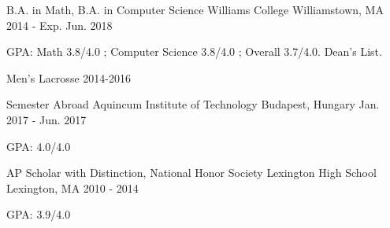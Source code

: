 

\begin{cventries}

\begin{cventry}
  {B.A. in Math, B.A. in Computer Science} %
  {Williams College} %
  {Williamstown, MA} %
  {2014 - Exp. Jun. 2018} %
  {
    \begin{cvitems} %
      \item {GPA: Math 3.8/4.0 ; Computer Science 3.8/4.0 ; Overall 3.7/4.0. Dean's List.}
      \item {Men's Lacrosse 2014-2016}
    \end{cvitems}
  }
\end{cventry}
\cventry
  {Semester Abroad} %
  {Aquincum Institute of Technology} %
  {Budapest, Hungary} %
  {Jan. 2017 - Jun. 2017} %
  {
    \begin{cvitems} %
      \item {GPA: 4.0/4.0}\\
    \end{cvitems}
  }

\cventry
  {AP Scholar with Distinction, National Honor Society} %
  {Lexington High School} %
  {Lexington, MA} %
  {2010 - 2014} %
  {
    \begin{cvitems} %
      \item {GPA: 3.9/4.0}
    \end{cvitems}
  }

\end{cventries}
